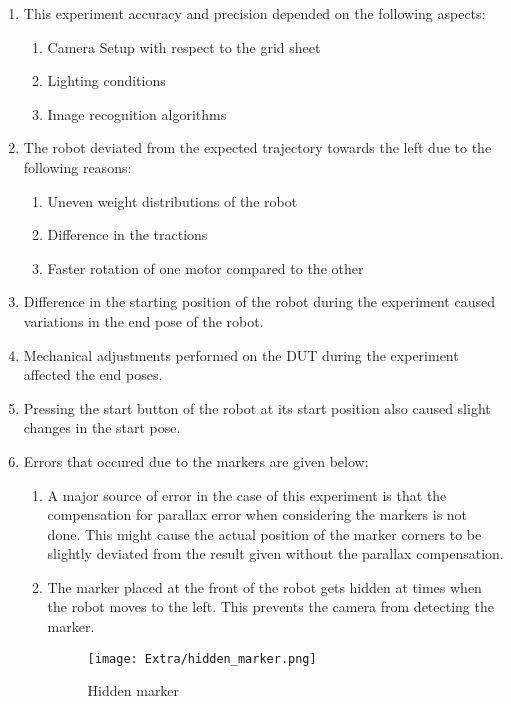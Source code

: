 \documentclass[10pt,a4paper]{article}
\begin{document}
\begin{enumerate}
	\item
	This experiment accuracy and precision depended on the following aspects:
	\begin{enumerate}
		\item
		Camera Setup with respect to the grid sheet
		\item
		Lighting conditions
		\item
		Image recognition algorithms
	\end{enumerate}	 
	\item
	The robot deviated from the expected trajectory towards the left due to the following reasons:
	\begin{enumerate}
		\item
		Uneven weight distributions of the robot
		\item
		Difference in the tractions
		\item
		Faster rotation of one motor compared to the other
	\end{enumerate}
	\item
	Difference in the starting position of the robot during the experiment caused variations in the end pose of the robot.
	\item
	Mechanical adjustments performed on the DUT during the experiment affected the end poses.
	\item
	Pressing the start button of the robot at its start position also caused slight changes in the start pose.
	\item
	Errors that occured due to the markers are given below:
	\begin{enumerate}
		\item
		A major source of error in the case of this experiment is that the compensation for parallax error when considering the markers is not done. This might cause the actual position of the marker corners to be slightly deviated from the result given without the parallax compensation.
		
		\item
		The marker placed at the front of the robot gets hidden at times when the robot moves to the left. This prevents the camera from detecting the marker.
		
		\vspace{0.5cm}
		
		\begin{figure}[h]
			\centering
			\texttt{[image: Extra/hidden\_marker.png]}
			\caption{ Hidden marker}
		\end{figure}
		

\end{enumerate}
\end{enumerate}
\end{document}
